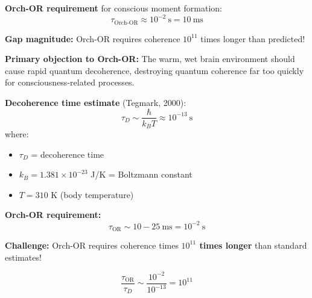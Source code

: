 \textbf{Orch-OR requirement} for conscious moment formation:
\begin{equation}
\label{eq:orchor-time}
\tau_{\text{Orch-OR}} \approx 10^{-2}~\text{s} = 10~\text{ms}
\end{equation}

\textbf{Gap magnitude:} Orch-OR requires coherence $10^{11}$ times longer than predicted!

\begin{warningbox}
\textbf{Primary objection to Orch-OR:} The warm, wet brain environment should cause rapid quantum decoherence, destroying quantum coherence far too quickly for consciousness-related processes.
\end{warningbox}

\textbf{Decoherence time estimate} (Tegmark, 2000):
\begin{equation}
\label{eq:decoherence-time}
\tau_D \sim \frac{\hbar}{k_B T} \approx 10^{-13}~\text{s}
\end{equation}
where:
\begin{itemize}
\item $\tau_D$ = decoherence time
\item $k_B = 1.381 \times 10^{-23}$ J/K = Boltzmann constant
\item $T = 310$ K (body temperature)
\end{itemize}

\textbf{Orch-OR requirement:}
\begin{equation}
\label{eq:orch-or-time}
\tau_{\text{OR}} \sim 10-25~\text{ms} = 10^{-2}~\text{s}
\end{equation}

\textbf{Challenge:} Orch-OR requires coherence times \textbf{$10^{11}$ times longer} than standard estimates!

\begin{equation}
\label{eq:coherence-gap}
\frac{\tau_{\text{OR}}}{\tau_D} \sim \frac{10^{-2}}{10^{-13}} = 10^{11}
\end{equation}

